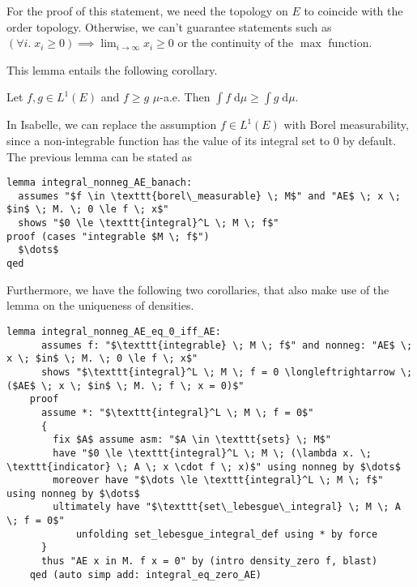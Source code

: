 \begin{remark}
For the proof of this statement, we need the topology on $E$ to coincide with the order topology. Otherwise, we can't guarantee statements such as $(\forall i. \; x_i \ge 0) \implies \lim_{i \to \infty} x_i \ge 0$ or the continuity of the $\max$ function.
\end{remark}
This lemma entails the following corollary.
\begin{corollary}
	Let $f, g \in L^1(E)$ and $f \ge g$ $\mu$-a.e. Then $\int f\;\textrm{d} \mu \ge \int g\;\textrm{d} \mu$.
\end{corollary}

In Isabelle, we can replace the assumption $f \in L^1(E)$ with Borel measurability, since a non-integrable function has the value of its integral set to $0$ by default. The previous lemma can be stated as

{\small
\begin{lstlisting}[style=isabelle]
lemma integral_nonneg_AE_banach:
  assumes "$f \in \texttt{borel\_measurable} \; M$" and "AE$ \; x \; $in$ \; M. \; 0 \le f \; x$"
  shows "$0 \le \texttt{integral}^L \; M \; f$"
proof (cases "integrable $M \; f$") 
  $\dots$
qed
\end{lstlisting}
}

Furthermore, we have the following two corollaries, that also make use of the lemma on the uniqueness of densities.

\begin{isacorollary}
{\small
	\begin{lstlisting}[style=isabelle]
	lemma integral_nonneg_AE_eq_0_iff_AE:
	  assumes f: "$\texttt{integrable} \; M \; f$" and nonneg: "AE$ \; x \; $in$ \; M. \; 0 \le f \; x$"
	  shows "$\texttt{integral}^L \; M \; f = 0 \longleftrightarrow \; ($AE$ \; x \; $in$ \; M. \; f \; x = 0)$"
	proof 
	  assume *: "$\texttt{integral}^L \; M \; f = 0$"
	  {
		fix $A$ assume asm: "$A \in \texttt{sets} \; M$"
		have "$0 \le \texttt{integral}^L \; M \; (\lambda x. \; \texttt{indicator} \; A \; x \cdot f \; x)$" using nonneg by $\dots$
		moreover have "$\dots \le \texttt{integral}^L \; M \; f$" using nonneg by $\dots$
		ultimately have "$\texttt{set\_lebesgue\_integral} \; M \; A \; f = 0$" 
			unfolding set_lebesgue_integral_def using * by force
	  }
	  thus "AE x in M. f x = 0" by (intro density_zero f, blast)
	qed (auto simp add: integral_eq_zero_AE)
	\end{lstlisting}
}
\end{isacorollary}

